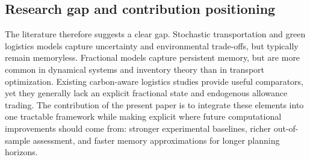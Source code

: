 \subsection{Research gap and contribution positioning}
The literature therefore suggests a clear gap. Stochastic transportation and green logistics models capture uncertainty and environmental trade-offs, but typically remain memoryless. Fractional models capture persistent memory, but are more common in dynamical systems and inventory theory than in transport optimization. Existing carbon-aware logistics studies provide useful comparators, yet they generally lack an explicit fractional state and endogenous allowance trading. The contribution of the present paper is to integrate these elements into one tractable framework while making explicit where future computational improvements should come from: stronger experimental baselines, richer out-of-sample assessment, and faster memory approximations for longer planning horizons.
